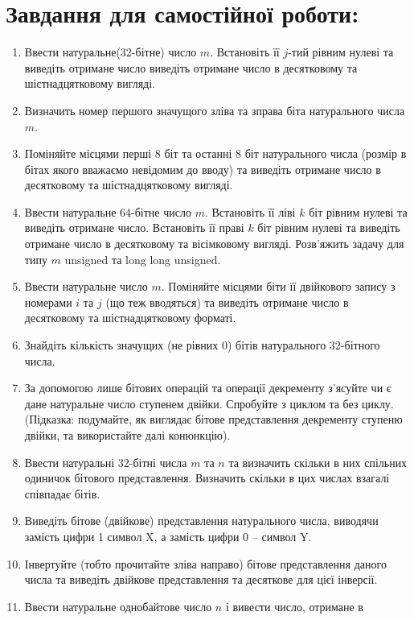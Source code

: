 \documentclass[a5paper,titlepage,openany,twoside,
]
{book_unv}%
\begin{document}
\section{Завдання для самостійної роботи:}

\begin{enumerate}
\def\labelenumi{\arabic{enumi})}
\setcounter{enumi}{7}
\item
  Ввести натуральне(32-бітне) число $m$. Встановіть її $j$-тий рівним нулеві
  та виведіть отримане число виведіть отримане число в десятковому та
  шістнадцятковому вигляді.
\item
  Визначить номер першого значущого зліва та зправа біта натурального
  числа $m$.
\item
  Поміняйте місцями перші 8 біт та останні 8 біт натурального числа
  (розмір в бітах якого вважаємо невідомим до вводу) та виведіть
  отримане число в десятковому та шістнадцятковому вигляді.
\item
  Ввести натуральне 64-бітне число $m$. Встановіть її ліві $k$ біт рівним
  нулеві та виведіть отримане число. Встановіть її праві $k$ біт рівним
  нулеві та виведіть отримане число в десятковому та вісімковому
  вигляді. Розв'яжить задачу для типу $m$ unsigned та long long unsigned.
\item
  Ввести натуральне число $m$. Поміняйте місцями біти її двійкового запису
  з номерами $i$ та $j$ (що теж вводяться) та виведіть отримане число в
  десятковому та шістнадцятковому форматі.
\item
  Знайдіть кількість значущих (не рівних 0) бітів натурального
  32-бітного числа.
\item
  За допомогою лише бітових операцій та операції декременту з'ясуйте чи є
  дане натуральне число ступенем двійки. Спробуйте з циклом та без
  циклу. (Підказка: подумайте, як виглядає бітове представлення
  декременту ступеню двійки, та використайте далі конюнкцію).
\item
  Ввести натуральні 32-бітні числа $m$ та $n$ та визначить скільки в них
  спільних одиничок бітового представлення. Визначить скільки в цих
  числах взагалі співпадає бітів.
\item
  Виведіть бітове (двійкове) представлення натурального числа, 
виводячи замість цифри 1 символ X, а замість цифри 0 -- символ Y.
\item
  Інвертуйте (тобто прочитайте зліва направо) бітове представлення
  даного числа та виведіть двійкове представлення та десяткове для цієї
  інверсії.
\item
  Ввести натуральне однобайтове число $n$ і вивести число, отримане в

\end{enumerate}
\end{document}
